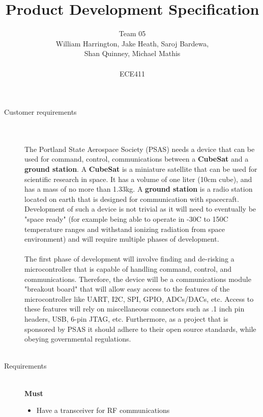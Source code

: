\documentclass[12pt]{article}
\begin{document}
\title{Product Development Specification}%
\author{Team 05\\William Harrington, Jake Heath, Saroj Bardewa,\\ Shan Quinney, Michael Mathis\\ \\ %
ECE411} %

\maketitle
 \small
\begin{description}
	\item[Customer requirements] \hfill \\ \\
		The Portland State Aerospace Society (PSAS) needs a device that can be used for command, control, communications between a \textbf{CubeSat} and a \textbf{ground station}.
		A \textbf{CubeSat} is a miniature satellite that can be used for scientific research in space. It has a volume of one liter (10cm cube), and has a mass of no more than 1.33kg.
		A \textbf{ground station} is a radio station located on earth that is designed for communication with spacecraft.
		Development of such a device is not trivial as it will need to eventually be "space ready" (for example being able to operate in -30C to 150C temperature ranges and withstand ionizing radiation from space environment)  and will require multiple phases of development. \hfill \\ \\
		The first phase of development will involve finding and de-risking a microcontroller that is capable of handling command, control, and communications.
		Therefore, the device will be a communications module "breakout board" that will allow easy access to the features of the microcontroller like UART, I2C, SPI, GPIO, ADCs/DACs, etc. Access to these features will rely on miscellaneous connectors such as .1 inch pin headers, USB, 6-pin JTAG, etc. Furthermore, as a project that is sponsored by PSAS it should adhere to their open source standards, while obeying governmental regulations.
		\hfill \\ \\
		\newpage
	\item[Requirements] \hfill \\
		\textbf{Must}
		\begin{itemize}
			\item{Have a transceiver for RF communications}

\end{itemize}
\end{description}
\end{document}
